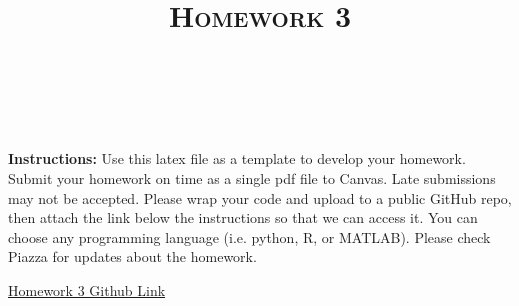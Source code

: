 \documentclass[a4paper]{article}
\title{\textsc{Homework 3}} %
\author{
\red{APOORVA KUMAR} \\
\red{908 461 5997}\\
}
\date{}
\theoremstyle{definition}
\newenvironment{soln}{
    \leavevmode\color{blue}\ignorespaces
}{}
\begin{document}
\maketitle 


\textbf{Instructions:} 
Use this latex file as a template to develop your homework. Submit your homework on time as a single pdf file to Canvas. Late submissions may not be accepted. Please wrap your code and upload to a public GitHub repo, then attach the link below the instructions so that we can access it. You can choose any programming language (i.e. python, R, or MATLAB). Please check Piazza for updates about the homework.\\

\begin{soln}
    \Large
    \href{https://github.com/cybr17crwlr/ECE-760-Machine-Learning-Assignments/tree/master/Homework%203}{Homework 3 Github Link}
\end{soln}
\end{document}
